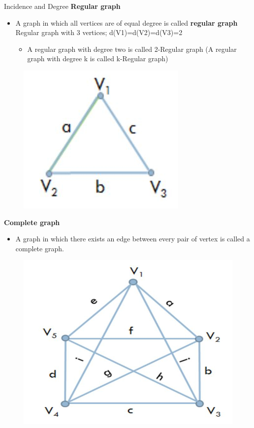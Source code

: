 \documentclass{beamer}
\begin{document}
\begin{frame}{Incidence and Degree}
	\textbf{Regular graph}
	\begin{itemize}
		\item 	A graph in which all vertices are of equal 
		degree is called \textbf{regular graph} 
		Regular graph with 3 vertices; d(V1)=d(V2)=d(V3)=2
		\begin{itemize}
			\item A regular graph with degree two is called 2-Regular graph (A regular graph with degree k is called k-Regular graph)
		\end{itemize}
	
	\end{itemize}
	\begin{figure}
	\includegraphics[scale=.23]{img/m29}
\end{figure}
\textbf{Complete graph}
\begin{itemize}
	\item A graph in which there exists an edge between every pair of vertex is 
	called a complete graph.
\end{itemize}
\begin{figure}
	\includegraphics[scale=.23]{img/m30}
\end{figure}
\end{frame}
\end{document}
